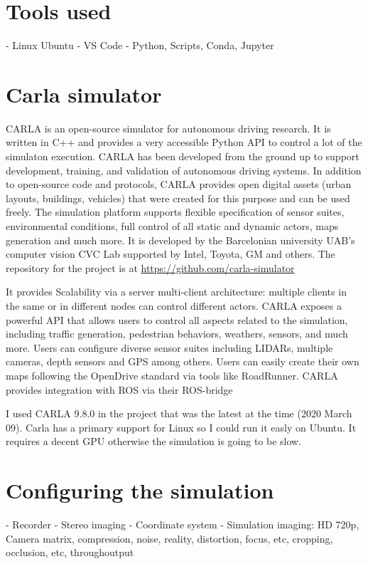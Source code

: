 \section{Tools used}
- Linux Ubuntu
- VS Code
- Python, Scripts, Conda, Jupyter

\section{Carla simulator}

CARLA\cite{Dosovitskiy17} is an open-source simulator for autonomous driving
research. It is written in C++ and provides a very accessible Python API to
control a lot of the simulaton execution. CARLA has been developed from the
ground up to support development, training, and validation of autonomous driving
systems. In addition to open-source code and protocols, CARLA provides open
digital assets (urban layouts, buildings, vehicles) that were created for this
purpose and can be used freely. The simulation platform supports flexible
specification of sensor suites, environmental conditions, full control of all
static and dynamic actors, maps generation and much more. It is developed by the
Barcelonian university UAB's computer vision CVC Lab supported by Intel, Toyota,
GM and others. The repository for the project is at \url{https://github.com/carla-simulator}

It provides Scalability via a server multi-client architecture: multiple clients
in the same or in different nodes can control different actors. CARLA exposes a
powerful API that allows users to control all aspects related to the simulation,
including traffic generation, pedestrian behaviors, weathers, sensors, and much
more. Users can configure diverse sensor suites including LIDARs, multiple
cameras, depth sensors and GPS among others. Users can easily create their own
maps following the OpenDrive standard via tools like RoadRunner. CARLA provides
integration with ROS via their ROS-bridge

I used CARLA 9.8.0 in the project that was the latest at the time (2020 March
09). Carla has a primary support for Linux so I could run it easly on Ubuntu. It
requires a decent GPU otherwise the simulation is going to be slow.


\section{Configuring the simulation}
- Recorder
- Stereo imaging
- Coordinate system
- Simulation imaging: HD 720p, Camera matrix, compression, noise, reality,
distortion, focus, etc, cropping, occlusion, etc, throughoutput
